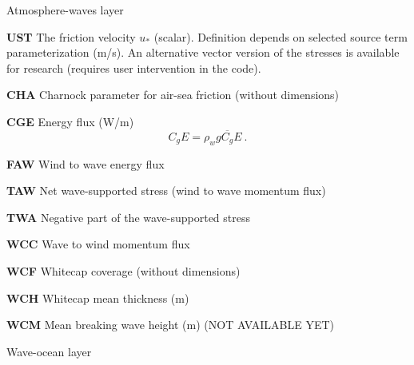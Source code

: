 \begin{list}{)\hfill}
\item{Atmosphere-waves layer}
\begin{list}{)\hfill}
            { \leftmargin 8mm 
             \rightmargin 0mm \itemsep 0mm \parsep 0mm}
\item \textbf{UST}  The friction velocity $u_\ast$ (scalar). Definition depends on
      selected source term parameterization (m/s). An alternative vector version
      of the stresses is available for research (requires user intervention in
      the code).
\item \textbf{CHA}  Charnock parameter for air-sea friction (without dimensions)
\item \textbf{CGE} Energy flux (W/m)
      \begin{equation} C_g E =  \rho_w g \overline{C_g} E
      \: . \label{eq:CgE} \end{equation}
\item \textbf{FAW} Wind to wave energy flux
\item \textbf{TAW} Net wave-supported stress (wind to wave momentum flux) 
\item \textbf{TWA} Negative part of the wave-supported stress
\item \textbf{WCC} Wave to wind momentum flux
\item \textbf{WCF} Whitecap coverage (without dimensions) 
\item \textbf{WCH} Whitecap mean thickness (m) 
\item \textbf{WCM} Mean breaking wave height (m) (NOT AVAILABLE YET)
\end{list}

\item{Wave-ocean layer}


\end{list}
